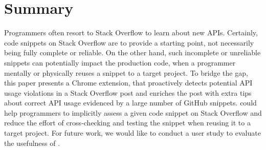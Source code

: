 \section{Summary}
\label{sec:summary}
Programmers often resort to Stack Overflow to learn about new APIs. Certainly, code snippets on Stack Overflow are to provide a starting point, not necessarily being fully complete or reliable. On the other hand, such incomplete or unreliable snippets can potentially impact the production code, when a programmer mentally or physically reuses a snippet to a target project. 
To bridge the gap, this paper presents a Chrome extension, {\tool} that proactively detects potential API usage violations in a Stack Overflow post and enriches the post with extra tips about correct API usage evidenced by a large number of GitHub snippets. {\tool} could help programmers to implicitly assess a given code snippet on Stack Overflow and reduce the effort of cross-checking and testing the snippet when reusing it to a target project. For future work, we would like to conduct a user study to evaluate the usefulness of {\tool}.